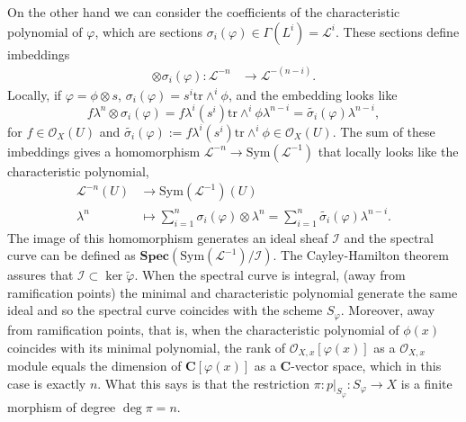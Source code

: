 \documentclass[12pt,a4paper]{book}
\theoremstyle{definition} \newtheorem{defn}[thm]{Definition}
\theoremstyle{definition} \newtheorem{ejemplo}[thm]{Example}
\theoremstyle{remark} \newtheorem{rem}[thm]{Remark}
\def\OO{\mathscr{O}}
\def\LL{\mathscr{L}}
\def\II{\mathscr{I}}
\def\CC{\mathbf{C}}
\def\tr{\mathrm{tr}}
\def\Sym{\mathrm{Sym}}
\def\RSpec{\mathbf{Spec}}
\begin{document}
  On the other hand we can consider the coefficients of the characteristic polynomial of $\varphi$, which are sections $\sigma_i(\varphi) \in \Gamma(L^i)=\LL^i$. These sections define imbeddings 
  \begin{align*}
    \otimes \sigma_i(\varphi):\LL^{-n}&\longrightarrow \LL^{-(n-i)}.
    \end{align*}
    Locally, if $\varphi=\phi \otimes s$, $\sigma_i(\varphi)=s^i \tr \wedge^i \phi$, and the embedding looks like
\begin{equation*}
  f\lambda^n \otimes \sigma_i(\varphi)=f \lambda^i(s^i)  \tr \wedge^i\phi \lambda^{n-i} = \tilde{\sigma_i}(\varphi) \lambda^{n-i},
\end{equation*}
for $f\in \OO_X(U)$ and $\tilde{\sigma_i}(\varphi):=f \lambda^i(s^i)  \tr \wedge^i\phi \in \OO_X(U)$.
The sum of these imbeddings gives a homomorphism $\LL^{-n}\rightarrow \Sym(\LL^{-1})$ that locally looks like the characteristic polynomial,
    \begin{align*}
      \LL^{-n}(U)&\longrightarrow \Sym(\LL^{-1})(U)\\ 
      \lambda^n &\longmapsto \sum_{i=1}^n \sigma_i(\varphi) \otimes \lambda^n=\sum_{i=1}^n \tilde{\sigma_i}(\varphi) \lambda^{n-i}.
      \end{align*}
      The image of this homomorphism generates an ideal sheaf $\II$ and the spectral curve can be defined as $\RSpec(\Sym(\LL^{-1})/\II)$. The Cayley-Hamilton theorem assures that $\II \subset \ker \tilde{\varphi}$. When the spectral curve is integral, (away from ramification points) the minimal and characteristic polynomial generate the same ideal and so the spectral curve coincides with the scheme $S_\varphi$. Moreover, away from ramification points, that is, when the characteristic polynomial of $\phi(x)$ coincides with its minimal polynomial, the rank of $\OO_{X,x}[\varphi(x)]$ as a $\OO_{X,x}$ module equals the dimension of $\CC[\varphi(x)]$ as a $\CC$-vector space, which in this case is exactly $n$. What this says is that the restriction $\pi:p|_{S_\varphi}:S_{\varphi} \rightarrow X$ is a finite morphism of degree $\deg \pi =n$.
\end{document}
